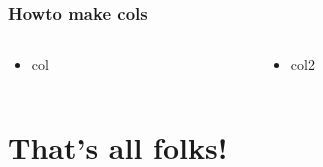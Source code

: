 \documentclass[bigger]{beamer}
\begin{document}
\begin{frame}
\frametitle{Howto make cols}
\label{sec-2-4}
\begin{columns}
\begin{column}{0.4\textwidth}
\begin{itemize}

\item col
\label{sec-2-4-1}%
\end{itemize} %
\end{column}
\begin{column}{0.6\textwidth}
\begin{itemize}

\item col2
\label{sec-2-4-2}%
\end{itemize} %
\end{column}
\end{columns}
\end{frame}
\section{That's all folks!}
\label{sec-3}
\end{document}
